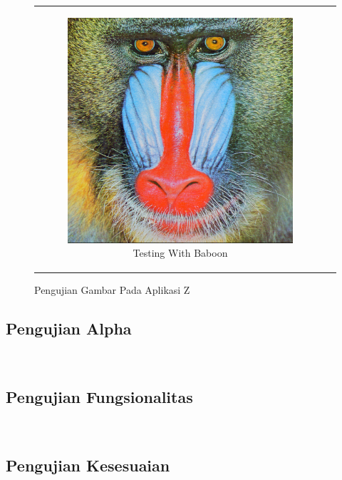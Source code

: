 \begin{figure}
\begin{tabular}[c]{cc}
		\begin{subfigure}[t]{0.45\textwidth}
			\includegraphics[width=\linewidth]{pics/baboon.png}
			\caption{Testing With Baboon} \label{fig:4b}
		\end{subfigure}
		
	\end{tabular}
	\caption{Pengujian Gambar Pada Aplikasi Z}
	\label{fig:41}
\end{figure}

\subsection{Pengujian Alpha}

\blindtext \\



\subsection{Pengujian Fungsionalitas}
\blindtext \\

\subsection{Pengujian Kesesuaian}
\blindtext \\

